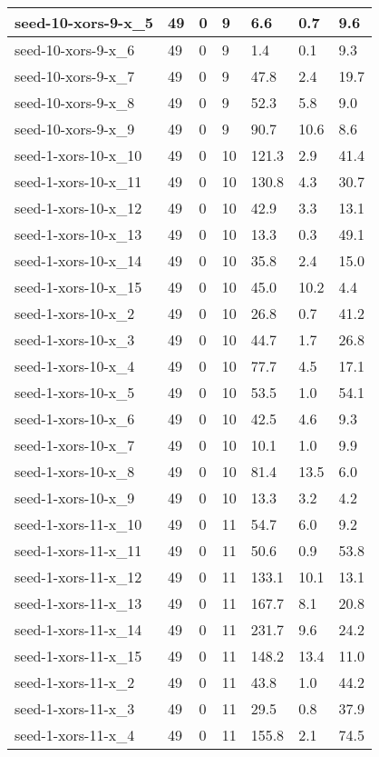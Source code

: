 \begin{scriptsize}
\begin{longtable}{|p{5cm}|l|l|l|l|l|l|}
seed-10-xors-9-x\_5&49&0&9&6.6&0.7&9.6 \\ \hline 
seed-10-xors-9-x\_6&49&0&9&1.4&0.1&9.3 \\ \hline 
seed-10-xors-9-x\_7&49&0&9&47.8&2.4&19.7 \\ \hline 
seed-10-xors-9-x\_8&49&0&9&52.3&5.8&9.0 \\ \hline 
seed-10-xors-9-x\_9&49&0&9&90.7&10.6&8.6 \\ \hline 
seed-1-xors-10-x\_10&49&0&10&121.3&2.9&41.4 \\ \hline 
seed-1-xors-10-x\_11&49&0&10&130.8&4.3&30.7 \\ \hline 
seed-1-xors-10-x\_12&49&0&10&42.9&3.3&13.1 \\ \hline 
seed-1-xors-10-x\_13&49&0&10&13.3&0.3&49.1 \\ \hline 
seed-1-xors-10-x\_14&49&0&10&35.8&2.4&15.0 \\ \hline 
seed-1-xors-10-x\_15&49&0&10&45.0&10.2&4.4 \\ \hline 
seed-1-xors-10-x\_2&49&0&10&26.8&0.7&41.2 \\ \hline 
seed-1-xors-10-x\_3&49&0&10&44.7&1.7&26.8 \\ \hline 
seed-1-xors-10-x\_4&49&0&10&77.7&4.5&17.1 \\ \hline 
seed-1-xors-10-x\_5&49&0&10&53.5&1.0&54.1 \\ \hline 
seed-1-xors-10-x\_6&49&0&10&42.5&4.6&9.3 \\ \hline 
seed-1-xors-10-x\_7&49&0&10&10.1&1.0&9.9 \\ \hline 
seed-1-xors-10-x\_8&49&0&10&81.4&13.5&6.0 \\ \hline 
seed-1-xors-10-x\_9&49&0&10&13.3&3.2&4.2 \\ \hline 
seed-1-xors-11-x\_10&49&0&11&54.7&6.0&9.2 \\ \hline 
seed-1-xors-11-x\_11&49&0&11&50.6&0.9&53.8 \\ \hline 
seed-1-xors-11-x\_12&49&0&11&133.1&10.1&13.1 \\ \hline 
seed-1-xors-11-x\_13&49&0&11&167.7&8.1&20.8 \\ \hline 
seed-1-xors-11-x\_14&49&0&11&231.7&9.6&24.2 \\ \hline 
seed-1-xors-11-x\_15&49&0&11&148.2&13.4&11.0 \\ \hline 
seed-1-xors-11-x\_2&49&0&11&43.8&1.0&44.2 \\ \hline 
seed-1-xors-11-x\_3&49&0&11&29.5&0.8&37.9 \\ \hline 
seed-1-xors-11-x\_4&49&0&11&155.8&2.1&74.5 \\ \hline 

\end{longtable}
\end{scriptsize}
